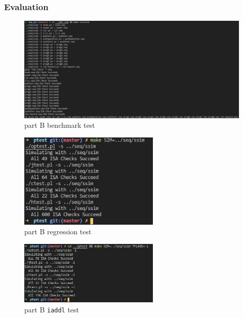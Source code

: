 \documentclass{article}
\begin{document}
\subsubsection{Evaluation}
\begin{figure}[H] %
        \centering %
        \includegraphics[width=1.0\textwidth]{partB-benchmark.jpg} %
        \caption{part B benchmark test} %
        \label{Fig.partB-benchmark} %
\end{figure}
\begin{figure}[H] %
        \centering %
        \includegraphics[width=0.6\textwidth]{partB-regression-test.jpg} %
        \caption{part B regression test} %
        \label{Fig.partB-regression} %
\end{figure}
\begin{figure}[H] %
        \centering %
        \includegraphics[width=0.6\textwidth]{partB-test-iaddl.jpg} %
        \caption{part B \texttt{iaddl} test} %
        \label{Fig.partB-iaddl} %
\end{figure}
\end{document}
